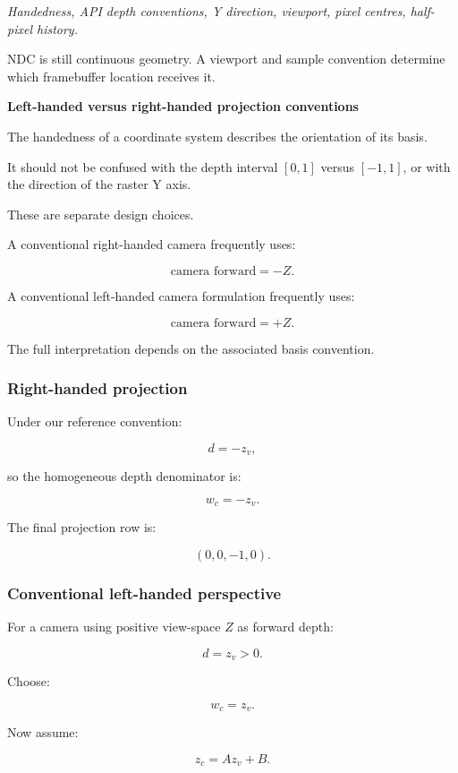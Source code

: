 \emph{Handedness, API depth conventions, Y direction, viewport, pixel centres, half-pixel history.}

NDC is still continuous geometry. A viewport and sample convention determine which framebuffer location receives it.

\textbf{Left-handed versus right-handed projection conventions}

The handedness of a coordinate system describes the orientation of its basis.

It should not be confused with the depth interval \([0,1]\) versus \([-1,1]\), or with the direction of the raster Y axis.

These are separate design choices.

A conventional right-handed camera frequently uses:

\[
 \boxed{ \text{camera forward}=-Z }.
\]

A conventional left-handed camera formulation frequently uses:

\[
 \boxed{ \text{camera forward}=+Z }.
\]

The full interpretation depends on the associated basis convention.

\subsubsection{Right-handed projection}\label{right-handed-projection}

Under our reference convention:

\[
 d=-z_v,
\]

so the homogeneous depth denominator is:

\[
 \boxed{w_c=-z_v}.
\]

The final projection row is:

\[
 \boxed{ (0,0,-1,0) }.
\]

\subsubsection{Conventional left-handed perspective}\label{conventional-left-handed-perspective}

For a camera using positive view-space \(Z\) as forward depth:

\[
 d=z_v>0.
\]

Choose:

\[
 \boxed{w_c=z_v}.
\]

Now assume:

\[
 z_c=Az_v+B.
\]

